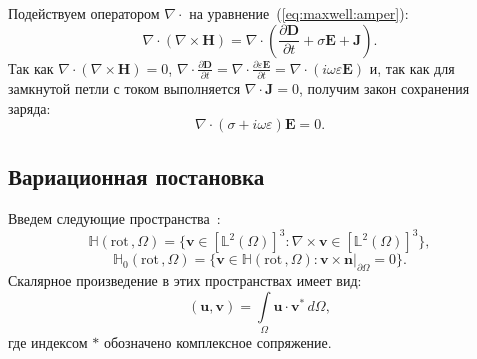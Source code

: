 \documentclass[a4paper,14pt]{article}
\begin{document}
Подействуем оператором $\nabla \cdot$ на уравнение~(\ref{eq:maxwell:amper}):
\begin{equation*}
	\nabla \cdot ( \nabla \times \mathbf{H} ) = \nabla \cdot ( \frac{\partial \mathbf{D}}{\partial t} + \sigma \mathbf{E} + \mathbf{J} ) .
\end{equation*}
Так как $\nabla \cdot ( \nabla \times \mathbf{H} ) = 0$, $\nabla \cdot \frac{\partial \mathbf{D}}{\partial t} = \nabla \cdot \frac{\partial \varepsilon \mathbf{E}}{\partial t} = \nabla \cdot (i \omega \varepsilon \mathbf{E})$ и, так как для замкнутой петли с током выполняется $\nabla \cdot \mathbf{J} = 0$, получим закон сохранения заряда:
\begin{equation}
	\nabla \cdot ( \sigma + i \omega \varepsilon ) \mathbf{E} = 0 . \label{eq:charge}
\end{equation}


\subsection{Вариационная постановка}
Введем следующие пространства~\citep{balandin_vfem,monk}:
\begin{equation*}
	\mathbb{H} ( \mathrm{rot}\,, \Omega ) = \lbrace \mathbf{v} \in [\mathbb{L}^{2}(\Omega)]^{3} : \nabla \times \mathbf{v} \in [\mathbb{L}^{2}(\Omega)]^{3} \rbrace , \label{eq:H_rot}
\end{equation*}
\begin{equation*}
	\mathbb{H}_{0}( \mathrm{rot}\,, \Omega ) = \lbrace \mathbf{v} \in \mathbb{H}(\mathrm{rot}\,, \Omega) : \left. \mathbf{v} \times \mathbf{n} \right|_{\partial \Omega} = 0  \rbrace . \label{eq:H0_rot}
\end{equation*}
Скалярное произведение в этих пространствах имеет вид:
\begin{equation*}
	( \mathbf{u}, \mathbf{v} ) = \int\limits_{\Omega} \mathbf{u} \cdot \mathbf{v}^{*} \,d\Omega ,
\end{equation*}
где индексом $*$ обозначено комплексное сопряжение.
\end{document}
